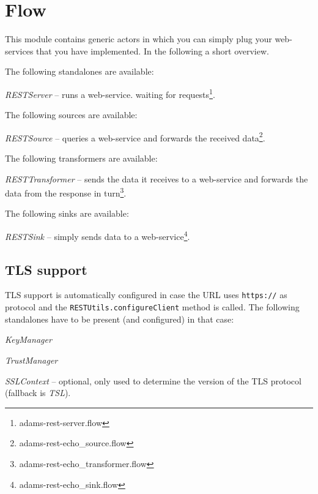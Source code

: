 \documentclass[a4paper]{book}
\begin{document}
\chapter{Flow}
This module contains generic actors in which you can simply plug your 
web-services that you have implemented. In the following a short overview.

The following standalones are available:
\begin{tight_itemize}
	\item \textit{RESTServer} -- runs a web-service. waiting for
	requests\footnote{adams-rest-server.flow}.
\end{tight_itemize}
The following sources are available:
\begin{tight_itemize}
	\item \textit{RESTSource} -- queries a web-service and forwards the received
	data\footnote{adams-rest-echo\_source.flow}.
\end{tight_itemize}
The following transformers are available:
\begin{tight_itemize}
	\item \textit{RESTTransformer} -- sends the data it receives to a web-service
	and forwards the data from the response in
	turn\footnote{adams-rest-echo\_transformer.flow}.
\end{tight_itemize}
The following sinks are available:
\begin{tight_itemize}
	\item \textit{RESTSink} -- simply sends data to a web-service\footnote{adams-rest-echo\_sink.flow}.
\end{tight_itemize}

\section{TLS support}
TLS support is automatically configured in case the URL uses \verb|https://| as
protocol and the \verb|RESTUtils.configureClient| method is called. The following
standalones have to be present (and configured) in that case:
\begin{tight_itemize}
  \item \textit{KeyManager}
  \item \textit{TrustManager}
  \item \textit{SSLContext} -- optional, only used to determine the version of the
  TLS protocol (fallback is \textit{TSL}).
\end{tight_itemize}



\end{document}
